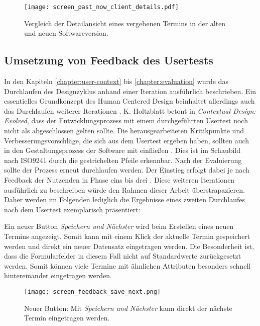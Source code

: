 \begin{figure}[H]
    \caption{Vergleich der Detailansicht eines vergebenen Termins in der alten und neuen Softwareversion.}
    \centering
    \texttt{[image: screen\_past\_now\_client\_details.pdf]}
\end{figure}

\subsection*{Umsetzung von Feedback des Usertests}
\label{paragraph:weitereIteration}

In den Kapiteln \ref{chapter:user-context} bis \ref{chapter:evaluation} wurde
das Durchlaufen des Designzyklus anhand einer Iteration ausführlich
beschrieben. Ein essentielles Grundkonzept des Human Centered Design beinhaltet
allerdings auch das Durchlaufen weiterer Iterationen \cite{hcd}. K. Holtzblatt
betont in \textit{Contextual Design: Evolved}, dass der Entwicklungsprozess mit
einem durchgeführten Usertest noch nicht als abgeschlossen gelten sollte. Die
herausgearbeiteten Kritikpunkte und Verbesserungsvorschläge, die sich aus dem
Usertest ergeben haben, sollten auch in den Gestaltungsprozess der Software mit
einfließen \cite{holtzblattCDEvolved}. Dies ist im Schaubild nach ISO9241 durch
die gestrichelten Pfeile erkennbar. Nach der Evaluierung sollte der Prozess
erneut durchlaufen werden. Der Einstieg erfolgt dabei je nach Feedback der
Nutzenden in Phase eins bis drei \cite{ISO9241}. Diese weiteren Iterationen
ausführlich zu beschreiben würde den Rahmen dieser Arbeit überstrapazieren.
Daher werden im Folgenden lediglich die Ergebnisse eines zweiten Durchlaufes
nach dem Usertest exemplarisch präsentiert:

Ein neuer Button \textit{Speichern und Nächster} wird beim Erstellen eines
neuen Termins angezeigt. Somit kann mit einem Klick der aktuelle Termin
gespeichert werden und direkt ein neuer Datensatz eingetragen werden. Die
Besonderheit ist, dass die Formularfelder in diesem Fall nicht auf
Standardwerte zurückgesetzt werden. Somit können viele Termine mit ähnlichen
Attributen besonders schnell hintereinander eingetragen werden.

\begin{figure}[H]
    \caption{Neuer Button: Mit \textit{Speichern und Nächster} kann direkt der nächste Termin eingetragen werden.}
    \centering
    \texttt{[image: screen\_feedback\_save\_next.png]}
\end{figure}


